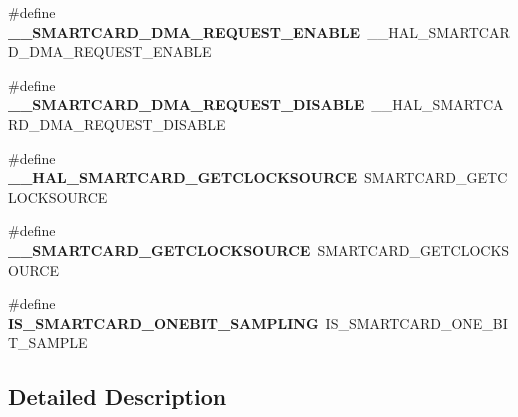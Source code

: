 \begin{DoxyCompactItemize}
\#define {\bfseries \+\_\+\+\_\+\+S\+M\+A\+R\+T\+C\+A\+R\+D\+\_\+\+D\+M\+A\+\_\+\+R\+E\+Q\+U\+E\+S\+T\+\_\+\+E\+N\+A\+B\+LE}~\+\_\+\+\_\+\+H\+A\+L\+\_\+\+S\+M\+A\+R\+T\+C\+A\+R\+D\+\_\+\+D\+M\+A\+\_\+\+R\+E\+Q\+U\+E\+S\+T\+\_\+\+E\+N\+A\+B\+LE
\item 
\mbox{\label{group___h_a_l___s_m_a_r_t_c_a_r_d___aliased___macros_gac7fcc6baa98b300ea02656c79c48b2a9}} 
\#define {\bfseries \+\_\+\+\_\+\+S\+M\+A\+R\+T\+C\+A\+R\+D\+\_\+\+D\+M\+A\+\_\+\+R\+E\+Q\+U\+E\+S\+T\+\_\+\+D\+I\+S\+A\+B\+LE}~\+\_\+\+\_\+\+H\+A\+L\+\_\+\+S\+M\+A\+R\+T\+C\+A\+R\+D\+\_\+\+D\+M\+A\+\_\+\+R\+E\+Q\+U\+E\+S\+T\+\_\+\+D\+I\+S\+A\+B\+LE
\item 
\mbox{\label{group___h_a_l___s_m_a_r_t_c_a_r_d___aliased___macros_ga94815bec2412334dadbc50408ff955f2}} 
\#define {\bfseries \+\_\+\+\_\+\+H\+A\+L\+\_\+\+S\+M\+A\+R\+T\+C\+A\+R\+D\+\_\+\+G\+E\+T\+C\+L\+O\+C\+K\+S\+O\+U\+R\+CE}~S\+M\+A\+R\+T\+C\+A\+R\+D\+\_\+\+G\+E\+T\+C\+L\+O\+C\+K\+S\+O\+U\+R\+CE
\item 
\mbox{\label{group___h_a_l___s_m_a_r_t_c_a_r_d___aliased___macros_gaba3d4f1525efcda959a2a468889af9d6}} 
\#define {\bfseries \+\_\+\+\_\+\+S\+M\+A\+R\+T\+C\+A\+R\+D\+\_\+\+G\+E\+T\+C\+L\+O\+C\+K\+S\+O\+U\+R\+CE}~S\+M\+A\+R\+T\+C\+A\+R\+D\+\_\+\+G\+E\+T\+C\+L\+O\+C\+K\+S\+O\+U\+R\+CE
\item 
\mbox{\label{group___h_a_l___s_m_a_r_t_c_a_r_d___aliased___macros_ga02c2a746784a8186a7a1fbbe452670d3}} 
\#define {\bfseries I\+S\+\_\+\+S\+M\+A\+R\+T\+C\+A\+R\+D\+\_\+\+O\+N\+E\+B\+I\+T\+\_\+\+S\+A\+M\+P\+L\+I\+NG}~I\+S\+\_\+\+S\+M\+A\+R\+T\+C\+A\+R\+D\+\_\+\+O\+N\+E\+\_\+\+B\+I\+T\+\_\+\+S\+A\+M\+P\+LE
\end{DoxyCompactItemize}


\subsection{Detailed Description}
